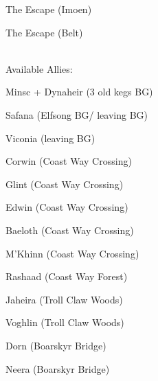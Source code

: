 \documentclass[10pt,a4,twoside]{book}
\begin{document}
\begin{titlepage}
\begin{multicols}{3}
\begin{trivlist}
\item The Escape (Imoen)
\item The Escape (Belt)
\end{trivlist}
\hrulefill
\\Available Allies:
\begin{trivlist}
\item Minsc + Dynaheir (3 old kegs BG)
\item Safana (Elfsong BG/ leaving BG)
\item Viconia (leaving BG)
\item Corwin (Coast Way Crossing)
\item Glint (Coast Way Crossing)
\item Edwin (Coast Way Crossing)
\item Baeloth (Coast Way Crossing)
\item M'Khinn (Coast Way Crossing)
\item Rashaad (Coast Way Forest)
\item Jaheira (Troll Claw Woods)
\item Voghlin (Troll Claw Woods)
\item Dorn (Boarskyr Bridge)
\item Neera (Boarskyr Bridge)


\end{trivlist}
\end{multicols}
\end{titlepage}
\end{document}

